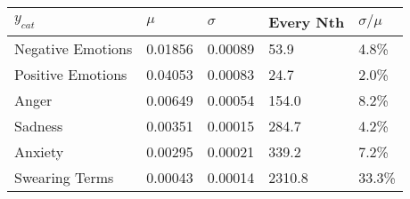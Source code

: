 \begin{tabular}{lllll}
\toprule
$y_{cat}$ &    $\mu$ & $\sigma$ & Every Nth & $\sigma / \mu$ \\
\midrule
Negative Emotions &  0.01856 &  0.00089 &      53.9 &          4.8\% \\
Positive Emotions &  0.04053 &  0.00083 &      24.7 &          2.0\% \\
Anger             &  0.00649 &  0.00054 &     154.0 &          8.2\% \\
Sadness           &  0.00351 &  0.00015 &     284.7 &          4.2\% \\
Anxiety           &  0.00295 &  0.00021 &     339.2 &          7.2\% \\
Swearing Terms    &  0.00043 &  0.00014 &    2310.8 &         33.3\% \\
\bottomrule
\end{tabular}
